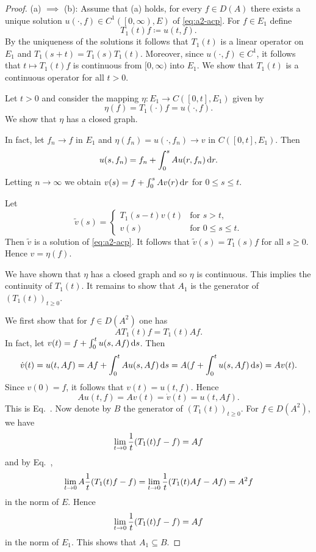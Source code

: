 \begin{proof} (a) $\implies$ (b):   
Assume that (a) holds, \ie for every $f \in D(A)$ there exists a unique solution $u(\cdot,f) \in C^{1}(\left[0,\infty\right),E)$ of \eqref{eq:a2-acp}.
For $f \in E_{1}$ define 
\[
T_{1}(t)f \coloneq u(t,f) .
\]
By the uniqueness of the solutions it follows that $T_{1}(t)$ is a linear operator on $E_{1}$ and $T_{1}(s+t) = T_{1}(s)T_{1}(t)$.
Moreover, since $u(\cdot,f) \in C^{1}$, it follows that $t \mapsto T_{1}(t)f$ is continuous from $[0,\infty)$ into $E_{1}$.
We show that $T_{1}(t)$ is a continuous operator for all $t > 0$.

Let $t > 0$ and consider the mapping $\eta \colon E_{1} \to C([0,t],E_{1})$ given by 
\[
    \eta(f) = T_{1}(\cdot)f = u(\cdot,f) .
\]
We show that $\eta$ has a closed graph.

In fact, let $f_{n} \to f$ in $E_{1}$ and $\eta(f_{n}) = u(\cdot,f_{n}) \to v$ in $C([0,t],E_{1})$.
Then 
\[
u(s,f_{n}) = f_{n} + \int_{0}^{s} Au(r,f_{n}) \mathop{}\!\mathrm{d}{r} .
\]
Letting $n \to \infty$ we obtain $v(s) = f + \int_{0}^{s} Av(r) \mathop{}\!\mathrm{d}{r}$ for $0 \leq s \leq t$.

Let 
\[
\tilde{v}(s) = 
\begin{cases}
    T_{1}(s-t)v(t)      & \text{for $s > t$,}\\
    v(s) & \text{for $0 \leq s \leq t$.}
\end{cases}
\]
Then $\tilde{v}$ is a solution of \eqref{eq:a2-acp}.
It follows that $\tilde{v}(s) = T_{1}(s)f$ for all $s \geq 0$.
Hence $v = \eta(f)$.

We have shown that $\eta$ has a closed graph and so $\eta$ is continuous.
This implies the continuity of\/ $T_{1}(t)$.
It remains to show that $A_{1}$ is the generator of\/ $(T_{1}(t))_{t \geq 0}$.

We first show that for $f \in D(A^{2})$ one has
\begin{equation}\label{eq:a2-1.1}
AT_{1}(t)f = T_{1}(t)Af.
\end{equation}
In fact, let $v(t) = f + \int_{0}^{t} u(s,Af) \mathop{}\!\mathrm{d}{s}$.
Then 
\[
\dot{v}(t) = u(t,Af) = Af + \int_{0}^{t} Au(s,Af) \mathop{}\!\mathrm{d}{s} = A(f + \int_{0}^{t} u(s,Af) \mathop{}\!\mathrm{d}{s}) = Av(t). 
\]
Since $v(0) = f$, it follows that $v(t) = u(t,f)$.
Hence 
%
\[
	Au(t,f) = Av(t) = \dot{v}(t) = u(t,Af) .
\]
%
This is Eq.~.
Now denote by $B$ the generator of\/ $(T_{1}(t))_{t \geq 0}$.
For $f \in D(A^{2})$, we have
\[
    \lim_{t \to 0} \frac{1}{t}\mleft( T_{1}(t)f - f \mright) = Af
\]
and by Eq.~,
\[
    \lim_{t \to 0} A\frac{1}{t} \mleft( T_{1}(t)f - f \mright) = 
    \lim_{t \to 0} \frac{1}{t} \mleft( T_{1}(t)Af - Af \mright)
    = A^{2}f
\]
in the norm of\/ $E$.
Hence 
\[ 
\lim_{t \to 0} \frac{1}{t} \mleft( T_{1}(t)f - f \mright) = Af
\]
in the norm of\/ $E_{1}$.
This shows that $A_{1} \subseteq B$.


\end{proof}
